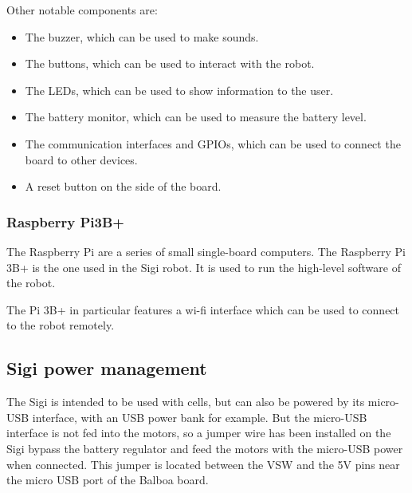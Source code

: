 \documentclass{article}
\begin{document}
Other notable components are:

\begin{itemize}
    \item The buzzer, which can be used to make sounds.

    \item The buttons, which can be used to interact with the robot.

    \item The LEDs, which can be used to show information to the user.

    \item The battery monitor, which can be used to measure the battery level.

    \item The communication interfaces and GPIOs, which can be used to connect the board to
        other devices.

    \item A reset button on the side of the board.
\end{itemize}

\subsubsection{Raspberry Pi3B+}
The Raspberry Pi are a series of small single-board computers.
The Raspberry Pi 3B+ is the one used in the Sigi robot.
It is used to run the high-level software of the robot.

The Pi 3B+ in particular features a wi-fi interface which can be used to connect to the robot
remotely.

\subsection{Sigi power management}
The Sigi is intended to be used with cells, but can also be powered by its micro-USB interface,
with an USB power bank for example.
But the micro-USB interface is not fed into the motors, so a jumper wire has been installed on the
Sigi bypass the battery regulator and feed the motors with the micro-USB power when connected.
This jumper is located between the VSW and the 5V pins near the micro USB port of the Balboa board.
\end{document}
